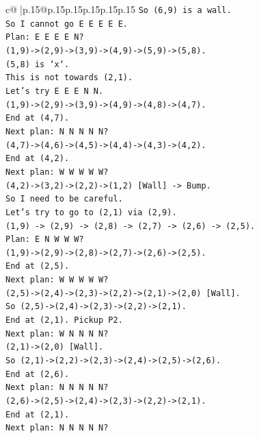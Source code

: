 \documentclass{article}
\begin{document}
{\begin{supertabular}{c@{$\;$}|p{.15\linewidth}@{}p{.15\linewidth}p{.15\linewidth}p{.15\linewidth}p{.15\linewidth}p{.15\linewidth}}
{{{\texttt{So (6,9) is a wall.} \\
\texttt{So I cannot go E E E E E.} \\
\texttt{Plan: E E E E N?} \\
\texttt{(1,9){-}>(2,9){-}>(3,9){-}>(4,9){-}>(5,9){-}>(5,8).} \\
\texttt{(5,8) is `x`.} \\
\texttt{This is not towards (2,1).} \\
\texttt{Let's try E E E N N.} \\
\texttt{(1,9){-}>(2,9){-}>(3,9){-}>(4,9){-}>(4,8){-}>(4,7).} \\
\texttt{End at (4,7).} \\
\texttt{Next plan: N N N N N?} \\
\texttt{(4,7){-}>(4,6){-}>(4,5){-}>(4,4){-}>(4,3){-}>(4,2).} \\
\texttt{End at (4,2).} \\
\texttt{Next plan: W W W W W?} \\
\texttt{(4,2){-}>(3,2){-}>(2,2){-}>(1,2) {[}Wall{]} {-}> Bump.} \\
\texttt{So I need to be careful.} \\
\texttt{Let's try to go to (2,1) via (2,9).} \\
\texttt{(1,9) {-}> (2,9) {-}> (2,8) {-}> (2,7) {-}> (2,6) {-}> (2,5).} \\
\texttt{Plan: E N W W W?} \\
\texttt{(1,9){-}>(2,9){-}>(2,8){-}>(2,7){-}>(2,6){-}>(2,5).} \\
\texttt{End at (2,5).} \\
\texttt{Next plan: W W W W W?} \\
\texttt{(2,5){-}>(2,4){-}>(2,3){-}>(2,2){-}>(2,1){-}>(2,0) {[}Wall{]}.} \\
\texttt{So (2,5){-}>(2,4){-}>(2,3){-}>(2,2){-}>(2,1).} \\
\texttt{End at (2,1). Pickup P2.} \\
\texttt{Next plan: W N N N N?} \\
\texttt{(2,1){-}>(2,0) {[}Wall{]}.} \\
\texttt{So (2,1){-}>(2,2){-}>(2,3){-}>(2,4){-}>(2,5){-}>(2,6).} \\
\texttt{End at (2,6).} \\
\texttt{Next plan: N N N N N?} \\
\texttt{(2,6){-}>(2,5){-}>(2,4){-}>(2,3){-}>(2,2){-}>(2,1).} \\
\texttt{End at (2,1).} \\
\texttt{Next plan: N N N N N?} \\
}}}
\end{supertabular}}
\end{document}
